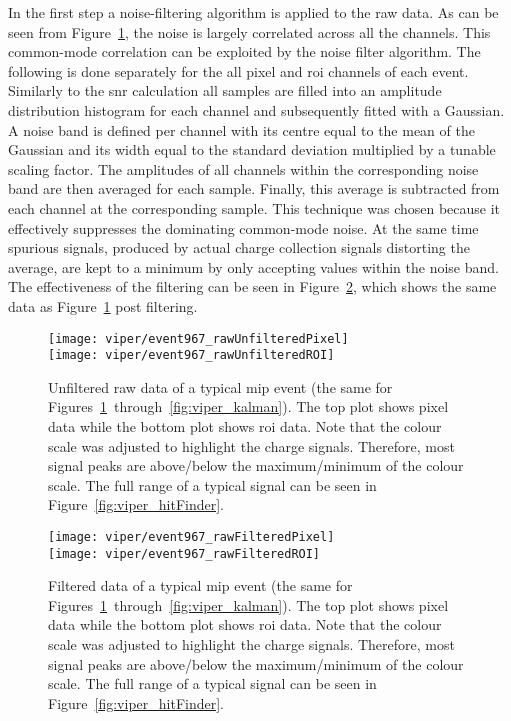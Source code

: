 In the first step a noise-filtering algorithm is applied to the raw data.
As can be seen from Figure~\ref{fig:viper_unfilteredRawData}, the noise is largely correlated across all the channels.
This common-mode correlation can be exploited by the noise filter algorithm.
The following is done separately for the all pixel and \gls{roi} channels of each event.
Similarly to the \gls{snr} calculation all samples are filled into an amplitude distribution histogram for each channel and subsequently fitted with a Gaussian.
A noise band is defined per channel with its centre equal to the mean of the Gaussian and its width equal to the standard deviation multiplied by a tunable scaling factor.
The amplitudes of all channels within the corresponding noise band are then averaged for each sample.
Finally, this average is subtracted from each channel at the corresponding sample.
This technique was chosen because it effectively suppresses the dominating common-mode noise.
At the same time spurious signals, produced by actual charge collection signals distorting the average, are kept to a minimum by only accepting values within the noise band.
The effectiveness of the filtering can be seen in Figure~\ref{fig:viper_filteredRawData}, which shows the same data as Figure~\ref{fig:viper_unfilteredRawData} post filtering.

\begin{figure}[htb]
	\centering
	\texttt{[image: viper/event967\_rawUnfilteredPixel]}\\
	\texttt{[image: viper/event967\_rawUnfilteredROI]}
	\caption[Unfiltered raw data of typical pixel demonstrator event]{%
		Unfiltered raw data of a typical \acrshort{mip} event (the same for Figures~\ref{fig:viper_unfilteredRawData}~through~\ref{fig:viper_kalman}).
		The top plot shows pixel data while the bottom plot shows \acrshort{roi} data.
		Note that the colour scale was adjusted to highlight the charge signals.
		Therefore, most signal peaks are above/below the maximum/minimum of the colour scale.
		The full range of a typical signal can be seen in Figure~\ref{fig:viper_hitFinder}.
	}
	\label{fig:viper_unfilteredRawData}
\end{figure}

\begin{figure}[htb]
	\centering
	\texttt{[image: viper/event967\_rawFilteredPixel]}\\
	\texttt{[image: viper/event967\_rawFilteredROI]}
	\caption[Filtered data of typical pixel demonstrator event]{%
		Filtered data of a typical \acrshort{mip} event (the same for Figures~\ref{fig:viper_unfilteredRawData}~through~\ref{fig:viper_kalman}).
		The top plot shows pixel data while the bottom plot shows \acrshort{roi} data.
		Note that the colour scale was adjusted to highlight the charge signals.
		Therefore, most signal peaks are above/below the maximum/minimum of the colour scale.
		The full range of a typical signal can be seen in Figure~\ref{fig:viper_hitFinder}.
	}
	\label{fig:viper_filteredRawData}
\end{figure}

